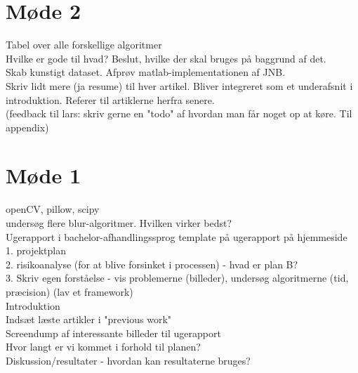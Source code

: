 \section*{Møde 2}
Tabel over alle forskellige algoritmer\\
Hvilke er gode til hvad? Beslut, hvilke der skal bruges på baggrund af det.\\
Skab kunstigt dataset. Afprøv matlab-implementationen af JNB.\\
Skriv lidt mere (ja resume) til hver artikel. Bliver integreret som et underafsnit i introduktion. Referer til artiklerne herfra senere.\\

(feedback til lars: skriv gerne en "todo" af hvordan man får noget op at køre. Til appendix)

\section*{Møde 1}
openCV, pillow, scipy\\
undersøg flere blur-algoritmer. Hvilken virker bedst?\\
Ugerapport i bachelor-afhandlingssprog
template på ugerapport på hjemmeside\\
    1. projektplan\\
    2. risikoanalyse (for at blive forsinket i processen) - hvad er plan B?\\
    3. Skriv egen forståelse - vis problemerne (billeder), undersøg algoritmerne (tid, præcision) (lav et framework)\\
    Introduktion\\
    
    Indsæt læste artikler i "previous work"\\
    Screendump af interessante billeder til ugerapport\\
    Hvor langt er vi kommet i forhold til planen?\\
    
    Diskussion/resultater - hvordan kan resultaterne bruges?\\
    
    



\newpage
